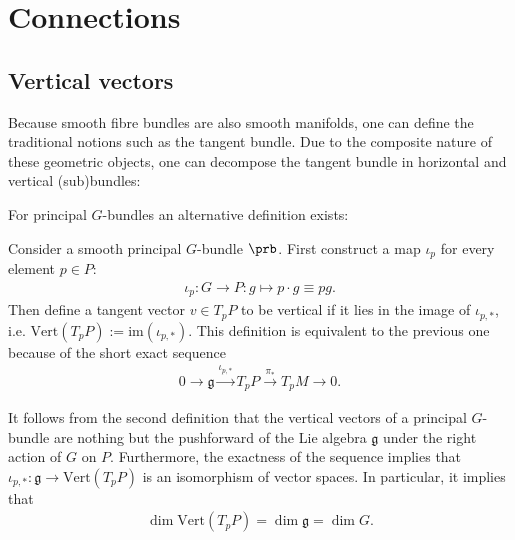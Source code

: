 \section{Connections}\label{section:connections}
\subsection{Vertical vectors}

    Because smooth fibre bundles are also smooth manifolds, one can define the traditional notions such as the tangent bundle. Due to the composite nature of these geometric objects, one can decompose the tangent bundle in horizontal and vertical (sub)bundles:

    For principal $G$-bundles an alternative definition exists:
    \begin{adefinition}
        Consider a smooth principal $G$-bundle $\prb$. First construct a map $\iota_p$ for every element $p\in P$:
        \begin{gather}
            \iota_p:G\rightarrow P: g\mapsto p\cdot g\equiv pg.
        \end{gather}
        Then define a tangent vector $v\in T_p P$ to be vertical if it lies in the image of $\iota_{p,\ast}$, i.e. $\text{Vert}(T_pP) := \text{im}(\iota_{p,\ast})$. This definition is equivalent to the previous one because of the short exact sequence
        \begin{gather}
            0\rightarrow\mathfrak{g}\xrightarrow{\iota_{p,\ast}}T_pP\xrightarrow{\pi_\ast}T_pM\rightarrow0.
        \end{gather}
    \end{adefinition}

    \begin{property}\label{diff:vertical_dimension}
        It follows from the second definition that the vertical vectors of a principal $G$-bundle are nothing but the pushforward of the Lie algebra $\mathfrak{g}$ under the right action of $G$ on $P$. Furthermore, the exactness of the sequence implies that $\iota_{p,\ast}:\mathfrak{g}\rightarrow\text{Vert}(T_pP)$ is an isomorphism of vector spaces. In particular, it implies that
        \begin{gather}
            \dim\text{Vert}(T_pP) = \dim\mathfrak{g} = \dim G.
        \end{gather}
    \end{property}

